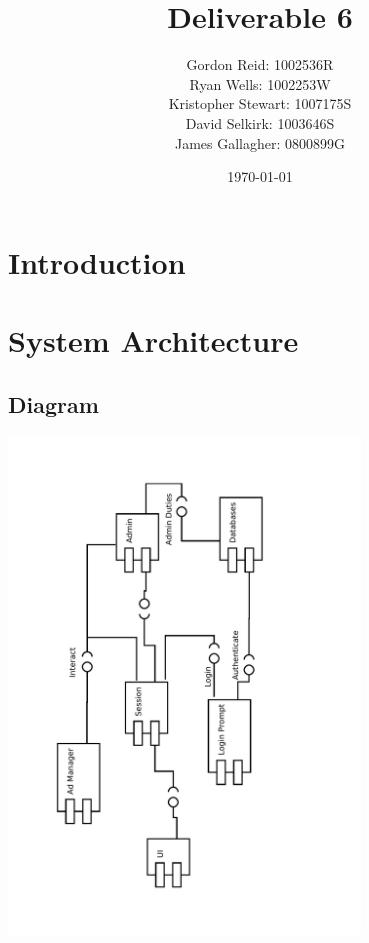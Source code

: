 \documentclass[12pt]{article}
\title{Deliverable 6}
\author{
    Gordon Reid: 1002536R\\
    Ryan Wells: 1002253W\\
    Kristopher Stewart: 1007175S\\
    David Selkirk: 1003646S\\
    James Gallagher: 0800899G\\
}
\date{\today}
\begin{document}
\maketitle

\newpage

\tableofcontents

\newpage

\section{Introduction}

\newpage

\section{System Architecture}
\subsection{Diagram}
\begin{centering}
  \includegraphics[width=0.7\textwidth,angle=270]{PSDDiagram.pdf}
\end{centering}
\end{document}
